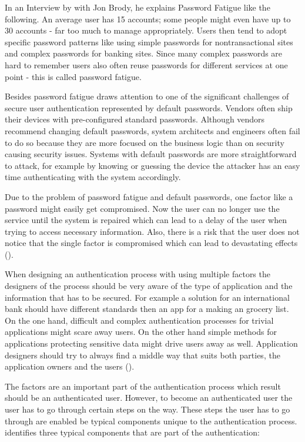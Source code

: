 In an Interview by \cite{Tomkins:2009:DPF} with Jon Brody, he explains Password Fatigue like the following. An average user has 15 accounts; some people might even have up to 30 accounts - far too much to manage appropriately. Users then tend to adopt specific password patterns like using simple passwords for nontransactional sites and complex passwords for banking sites. Since many complex passwords are hard to remember users also often reuse passwords for different services at one point - this is called password fatigue. 

Besides password fatigue \cite{Todorov:2007:MUI} draws attention to one of the significant challenges of secure user authentication represented by default passwords. Vendors often ship their devices with pre-configured standard passwords. Although vendors recommend changing default passwords, system architects and engineers often fail to do so because they are more focused on the business logic than on security causing security issues. Systems with default passwords are more straightforward to attack, for example by knowing or guessing the device the attacker has an easy time authenticating with the system accordingly. 


 Due to the problem of password fatigue and default passwords, one factor like a password might easily get compromised. Now the user can no longer use the service until the system is repaired which can lead to a delay of the user when trying to access necessary information. Also, there is a risk that the user does not notice that the single factor is compromised which can lead to devastating effects (\cite{Dasgupta:2017:AUA}). 

When designing an authentication process with using multiple factors the designers of the process should be very aware of the type of application and the information that has to be secured. For example a solution for an international bank should have different standards then an app for a making an grocery list. On the one hand, difficult and complex authentication processes for trivial applications might scare away users. On the other hand simple methods for applications protecting sensitive data might drive users away as well. Application designers should try to always find a middle way that suits both parties, the application owners and the users (\cite{NIST:2017:DIG}). 

The factors are an important part of the authentication process which result should be an authenticated user. However, to become an authenticated user the user has to go through certain steps on the way. These steps the user has to go through are enabled be typical components unique to the authentication process. \cite{Todorov:2007:MUI} identifies three typical components that are part of the authentication:

